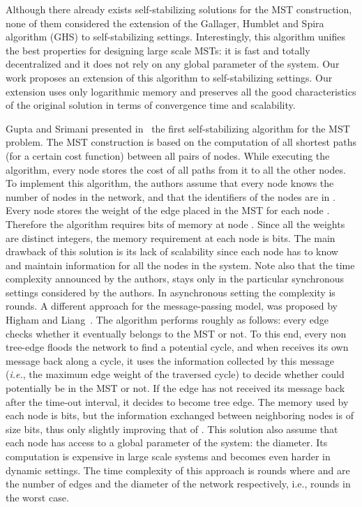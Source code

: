 \documentclass[11pt,a4paper]{article}
\begin{document}
Although there already exists self-stabilizing solutions for the MST construction, none of them considered the extension of   
the Gallager, Humblet and Spira algorithm (GHS) to self-stabilizing settings.  
Interestingly, this algorithm unifies the best properties for designing large scale 
MSTs: it is fast and totally decentralized and it does not 
rely on any global parameter of the system. Our work proposes an extension of this algorithm to self-stabilizing settings. Our extension uses only logarithmic memory and  
preserves all the good characteristics of the original solution in terms of 
convergence time and scalability. 

Gupta and Srimani presented in~\cite{AntonoiuS97} the first self-stabilizing algorithm for the MST problem. 
The MST construction is based on the computation of all 
shortest paths (for a certain cost function) 
between all pairs of nodes. While executing the algorithm, every node stores the cost of 
all paths from it to all the other nodes. To implement this algorithm, the authors assume that every node knows the number  of nodes in 
the network, and that the identifiers of the nodes are in . Every node  stores the weight of the edge  placed in the 
MST for each node . Therefore the algorithm requires  bits of memory at node . Since all 
the weights are distinct integers, the memory requirement at each node is  bits.
The main drawback of this solution is its lack of scalability since each node has to know and maintain information for all the nodes in the system. 
Note also that the time complexity announced by the authors, 
stays only in the particular synchronous settings considered by the
authors. In asynchronous setting the complexity is  rounds.
A different approach for the message-passing model, was proposed by 
Higham and Liang~\cite{HighamL01}. 
The algorithm performs roughly as follows: every edge checks 
whether it eventually belongs to the MST or not. 
To this end, every non tree-edge  floods the network to find 
a potential cycle, and when  receives its own message back along a cycle, it uses the information collected by this message (\emph{i.e.}, 
the maximum edge weight of the traversed cycle) to decide whether  could potentially be in the MST or not. If the edge  has not 
received its message back after the time-out interval, it decides to become tree edge. The memory used by each node is  bits, but the information exchanged between neighboring nodes is of size  bits, 
thus only slightly improving that of \cite{AntonoiuS97}. This solution
also assume that each node has 
access to a global parameter of the system: the diameter. Its
computation 
is expensive in large scale systems and becomes even harder in dynamic settings.
The time complexity of this approach is  rounds where  and  are the number of edges and the diameter of the network respectively, i.e.,  rounds in the worst case.
\end{document}
